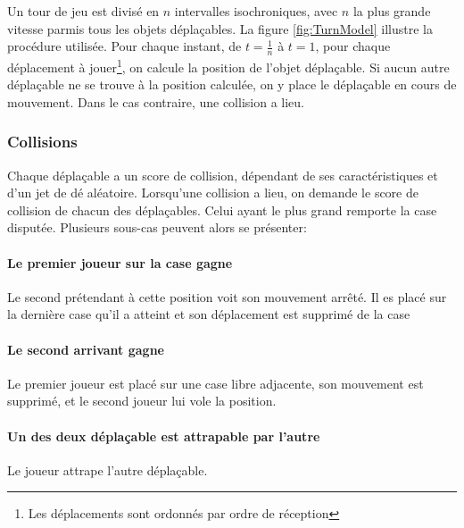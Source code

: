 Un tour de jeu est divisé en $n$ intervalles isochroniques, avec $n$ la plus grande vitesse parmis tous les objets déplaçables. La figure \ref{fig:TurnModel} illustre la procédure utilisée. Pour chaque instant, de $t = \frac{1}{n}$ à $t = 1$, pour chaque déplacement à jouer\footnote{Les déplacements sont ordonnés par ordre de réception}, on calcule la position de l'objet déplaçable. Si aucun autre déplaçable ne se trouve à la position calculée, on y place le déplaçable en cours de mouvement. Dans le cas contraire, une collision a lieu.

\subsubsection{Collisions}
Chaque déplaçable a un score de collision, dépendant de ses caractéristiques et d'un jet de dé aléatoire. Lorsqu'une collision a lieu, on demande le score de collision de chacun des déplaçables. Celui ayant le plus grand remporte la case disputée. Plusieurs sous-cas peuvent alors se présenter:

\paragraph{Le premier joueur sur la case gagne}
Le second prétendant à cette position voit son mouvement arrêté. Il es placé sur la dernière case qu'il a atteint et son déplacement est supprimé de la case

\paragraph{Le second arrivant gagne}
Le premier joueur est placé sur une case libre adjacente, son mouvement est supprimé, et le second joueur lui vole la position.

\paragraph{Un des deux déplaçable est attrapable par l'autre}
Le joueur attrape l'autre déplaçable.
